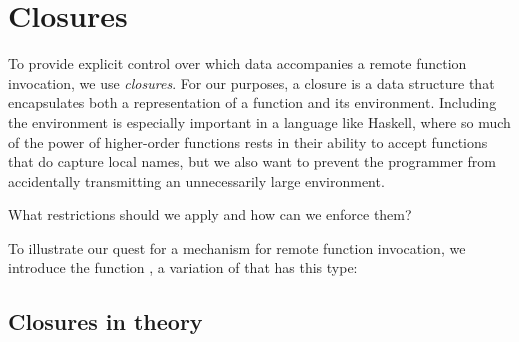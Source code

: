 \documentclass[preprint]{sigplanconf}
\begin{document}
\section{Closures}
\begin{comment}
there's no way for a library to know what to transmit, or even if it's serializable. Clearly, we don't want to prevent remotely-invocable functions from ever using non-serializable data. That would mean that any function that could be started using \textt{spawn} wouldn't be allowed to use \textt{MVar}.

all parameters to closure must be serializable

I agree that all we need to do to represent deferred evaluation is a
<fun,arg> tuple, and that's basically what a Closure is. We'll still
serialize arbitrarily-sized environments, as long as they are
converted explicitly to an argument, and that explicit control is an
advantage. And, yes, the practical argument that implicitly
serializing environments would be messy to implement is also valid.

only local and global names are visible in a top-level function. This is a reasonable approximation because all toplevel names are always available on all hosts and never need to be transmitted

prevention of sharing bad things (e.g. mvars, receiveports) is enforced by the serializer
\end{comment}

To provide explicit control over which data accompanies a remote function invocation, we use {\em closures}. For our purposes, a closure is a data structure that encapsulates both a representation of a function and its environment. Including the environment is especially important in a language like Haskell, where so much of the power of higher-order functions rests in their ability to accept functions that do capture local names, but we also want to prevent the programmer from accidentally transmitting an unnecessarily large environment.

What restrictions should we apply and how can we enforce them?

To illustrate our quest for a mechanism for remote function invocation, we introduce the function , a variation of  that has this type:

\subsection{Closures in theory}
\end{document}
